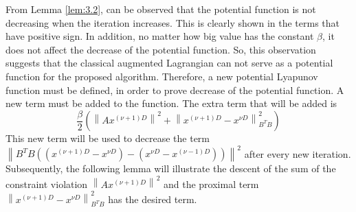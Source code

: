     From Lemma \ref{lem:3.2}, can be observed that the potential function is not decreasing when the iteration increases. This is clearly shown in the terms that have positive sign. In addition, no matter how big value has the constant $\beta$, it does not affect the decrease of the potential function. So, this observation suggests that the classical augmented Lagrangian can not serve as a potential function for the proposed algorithm. Therefore, a new potential Lyapunov function must be defined, in order to prove decrease of the potential function. A new term must be added to the function. The extra term that will be added is
    \begin{equation*}
        \frac{\beta}{2}\left(\left \lVert Ax^{(\nu + 1)D}\right \rVert^2 + \left \lVert x^{(\nu + 1)D} - x^{\nu D} \right \rVert^2_{B^TB} \right)
    \end{equation*}
    This new term will be used to decrease the term $\left \lVert B^TB\left( \left(x^{(\nu + 1)D} - x^{\nu D}\right) - \left( x^{\nu D} - x^{(\nu - 1)D} \right) \right) \right \rVert^2$ after every new iteration. Subsequently, the following lemma will illustrate the descent of the sum of the constraint violation $\left \lVert Ax^{(\nu + 1)D}\right \rVert^2$ and the proximal term $\left \lVert x^{(\nu + 1)D} - x^{\nu D} \right \rVert^2_{B^TB}$ has the desired term.
    
